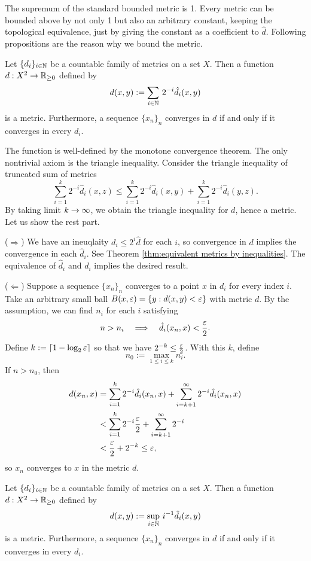 The supremum of the standard bounded metric is 1.
Every metric can be bounded above by not only 1 but also an arbitrary constant, keeping the topological equivalence, just by giving the constant as a coefficient to $\hat d$.
Following propositions are the reason why we bound the metric.

\begin{prop}
Let $\{d_i\}_{i\in\mathbb{N}}$ be a countable family of metrics on a set $X$.
Then a function $d:X^2\to\R_{\ge0}$ defined by
\[d(x,y):=\sum_{i\in\mathbb{N}}\,2^{-i}\hat d_i(x,y)\]
is a metric.
Furthermore, a sequence $\{x_n\}_n$ converges in $d$ if and only if it converges in every $d_i$.
\end{prop}
\begin{pf}
The function is well-defined by the monotone convergence theorem.
The only nontrivial axiom is the triangle inequality.
Consider the triangle inequality of truncated sum of metrics
\[\sum_{i=1}^k2^{-i}\hat d_i(x,z)\le\sum_{i=1}^k2^{-i}\hat d_i(x,y)+\sum_{i=1}^k2^{-i}\hat d_i(y,z).\]
By taking limit $k\to\oo$, we obtain the triangle inequality for $d$, hence a metric.
Let us show the rest part.

($\Rightarrow$)
We have an ineuqlaity $d_i\le2^i\hat d$ for each $i$, so convergence in $d$ implies the convergence in each $\hat d_i$.
See Theorem \ref{thm:equivalent metrics by inequalities}.
The equivalence of $\hat d_i$ and $d_i$ implies the desired result.

($\Leftarrow$)
Suppose a sequence $\{x_n\}_n$ converges to a point $x$ in $d_i$ for every index $i$.
Take an arbitrary small ball $B(x,\varepsilon)=\{y:d(x,y)<\varepsilon\}$ with metric $d$.
By the assumption, we can find $n_i$ for each $i$ satisfying
\[n>n_i\impl\hat d_i(x_n,x)<\frac\e2.\]
Define $k:=\lceil1-\log_2\varepsilon\rceil$ so that we have $2^{-k}\le\frac{\varepsilon}2$.
With this $k$, define
\[n_0:=\max_{1\le i\le k}n_i.\]
If $n>n_0$, then
\begin{align*}
d(x_n,x)&=\sum_{i=1}^k2^{-i}\hat d_i(x_n,x)+\sum_{i=k+1}^\infty2^{-i}\hat d_i(x_n,x)\\
&<\sum_{i=1}^k2^{-i}\frac{\varepsilon}2+\sum_{i=k+1}^\infty2^{-i}\\
&<\frac{\varepsilon}2+2^{-k}\le\varepsilon,
\end{align*}
so $x_n$ converges to $x$ in the metric $d$.
\end{pf}
\begin{prop}
Let $\{d_i\}_{i\in\mathbb{N}}$ be a countable family of metrics on a set $X$.
Then a function $d:X^2\to\R_{\ge0}$ defined by
\[d(x,y):=\sup_{i\in\mathbb{N}}\,i^{-1}\hat d_i(x,y)\]
is a metric.
Furthermore, a sequence $\{x_n\}_n$ converges in $d$ if and only if it converges in every $d_i$.
\end{prop}
